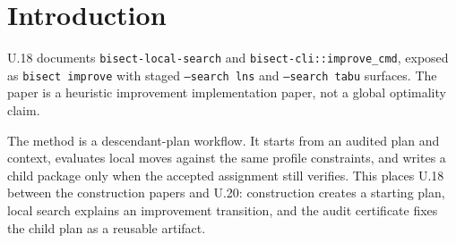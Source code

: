\section{Introduction}

U.18 documents \texttt{bisect-local-search} and
\texttt{bisect-cli::improve\_cmd}, exposed as \texttt{bisect improve} with
staged \texttt{--search lns} and \texttt{--search tabu} surfaces. The
paper is a heuristic improvement implementation paper, not a global optimality
claim.

The method is a descendant-plan workflow. It starts from an audited plan and
context, evaluates local moves against the same profile constraints, and writes
a child package only when the accepted assignment still verifies.
This places U.18 between the construction papers and U.20: construction creates
a starting plan, local search explains an improvement transition, and the audit
certificate fixes the child plan as a reusable artifact.
